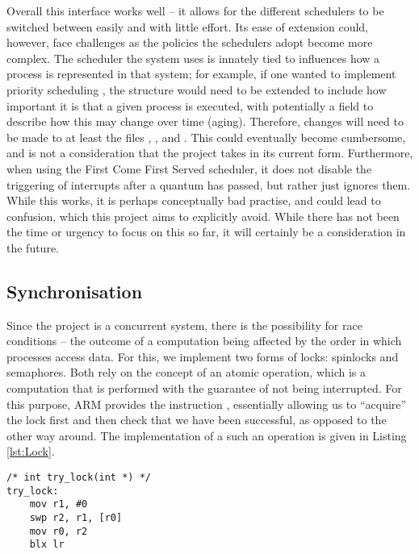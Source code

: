         Overall this interface works well -- it allows for the different
        schedulers to be switched between easily and with little effort. Its
        ease of extension could, however, face challenges as the policies the
        schedulers adopt become more complex. The scheduler the system uses is
        innately tied to influences how a process is represented in that system;
        for example, if one wanted to implement priority scheduling
        \cite[pg.~210]{DinosaurOS}, the structure  would need
        to be extended to include how important it is that a given process is
        executed, with potentially a field to describe how this may change over
        time (aging). Therefore, changes will need to be made to at least the
        files , , and . This could
        eventually become cumbersome, and is not a consideration that the
        project takes in its current form. Furthermore, when using the First
        Come First Served scheduler, it does not disable the triggering of
        interrupts after a quantum has passed, but rather just ignores them.
        While this works, it is perhaps conceptually bad practise, and could
        lead to confusion, which this project aims to explicitly avoid. While
        there has not been the time or urgency to focus on this so far, it will
        certainly be a consideration in the future.

\subsection{Synchronisation}
    Since the project is a concurrent system, there is the possibility for race
    conditions -- the outcome of a computation being affected by the order in
    which processes access data. For this, we implement two forms of locks:
    spinlocks and semaphores. Both rely on the concept of an atomic operation,
    which is a computation that is performed with the guarantee of not being
    interrupted. For this purpose, ARM provides the  instruction
    \cite{OnlineARMGuide}, essentially allowing us to ``acquire'' the lock first
    and then check that we have been successful, as opposed to the other way
    around. The implementation of a such an operation is given in Listing
    \ref{lst:Lock}.

    \lstset{language=c}
    \begin{lstlisting}[caption={Atomic lock
    operation},captionpos=b,label={lst:Lock}]
/* int try_lock(int *) */
try_lock:
    mov r1, #0
    swp r2, r1, [r0]
    mov r0, r2
    blx lr
    \end{lstlisting}

